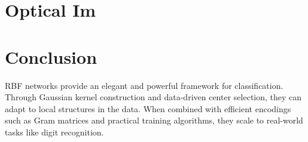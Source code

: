 \documentclass[twocolumn]{article} %
\begin{document}
\section{Optical Im}

\section{Conclusion}
RBF networks provide an elegant and powerful framework for classification. Through Gaussian kernel construction and data-driven center selection, they can adapt to local structures in the data. When combined with efficient encodings such as Gram matrices and practical training algorithms, they scale to real-world tasks like digit recognition.

{}

\end{document}
